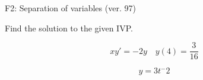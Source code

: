 \begin{exercise}
  \begin{exerciseTitle}F2: Separation of variables (ver. 97)\end{exerciseTitle}
  \begin{exerciseStatement}
    
Find the solution to the given IVP.

    
\[xy'= -2 y \hspace{1em} y( 4 ) = \frac{3}{16}\]

  \end{exerciseStatement}
  \begin{exerciseAnswer}
    
\[y= 3 t^ -2\]

  \end{exerciseAnswer}
\end{exercise}